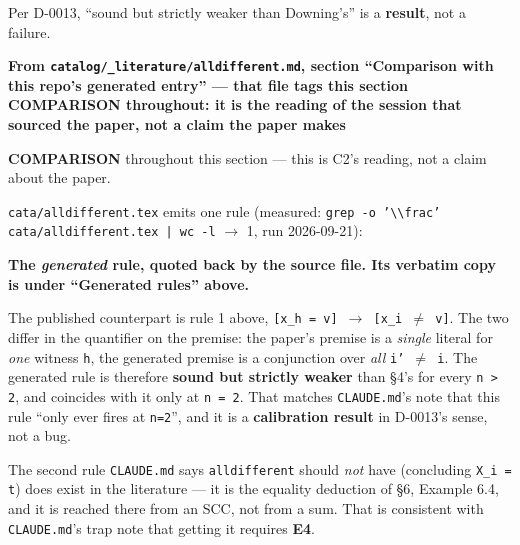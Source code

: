 \documentclass[10pt,a4paper]{article}
\newcommand{\provtag}[2]{{\small\sffamily\bfseries\textcolor{#1}{#2}}}
\newenvironment{calblock}{%
  \par\smallskip
  \def\FrameCommand{\textcolor{calbar}{\vrule width 1pt}\hspace{9pt}}%
  \MakeFramed{\advance\hsize-\width\FrameRestore}}%
  {\endMakeFramed\par\smallskip}
\newcommand{\litsubsub}[1]{\par{\sffamily\bfseries\small #1\par}}
\newcommand{\genrulehead}[1]{\par{\small\textbf{#1}\par}}
\newcommand{\litline}[1]{\noindent
  \resizebox{\ifdim\width>\linewidth\linewidth\else\width\fi}{!}{#1}\par}
\begin{document}
\begin{calblock}
Per D-0013, ``sound but strictly weaker than Downing's'' is a \textbf{result}, not a failure.

\litsubsub{From \texttt{catalog/\_\allowbreak{}literature/alldifferent.md}, section ``Comparison with this repo's generated entry'' --- that file tags this section \provtag{tagcomparison}{COMPARISON} throughout: it is the reading of the session that sourced the paper, not a claim the paper makes}
\provtag{tagcomparison}{COMPARISON} throughout this section --- this is C2's reading, not a claim about the paper.

\texttt{cata/alldifferent.tex} emits one rule (measured: \texttt{grep -\allowbreak{}o '\textbackslash{}\textbackslash{}frac' cata/\allowbreak{}alldifferent.\allowbreak{}tex | wc -\allowbreak{}l} $\rightarrow$ 1, run 2026-09-21):

\genrulehead{The \emph{generated} rule, quoted back by the source file. Its verbatim copy is under ``Generated rules'' above.}
{\raggedright
\litline{\ttfamily\small X\_\{i'\} = t,~~$\forall$i',~~i' $\neq$ i,~~i' $\in$ $\llbracket$1,n$\rrbracket$,~~i $\in$ $\llbracket$1,n$\rrbracket$}
\litline{\ttfamily\small ------------------------------- $\vdash$}
\litline{\ttfamily\small X\_i $\neq$ t}
\par}
The published counterpart is rule 1 above, \texttt{[x\_h = v] $\rightarrow$ [x\_i $\neq$ v]}. The two differ in the quantifier on the premise: the paper's premise is a \emph{single} literal for \emph{one} witness \texttt{h}, the generated premise is a conjunction over \emph{all} \texttt{i' $\neq$ i}. The generated rule is therefore \textbf{sound but strictly weaker} than \S{}4's for every \texttt{n > 2}, and coincides with it only at \texttt{n = 2}. That matches \texttt{CLAUDE.md}'s note that this rule ``only ever fires at \texttt{n=2}'', and it is a \textbf{calibration result} in D-0013's sense, not a bug.

The second rule \texttt{CLAUDE.md} says \texttt{alldifferent} should \emph{not} have (concluding \texttt{X\_i = t}) does exist in the literature --- it is the equality deduction of \S{}6, Example 6.4, and it is reached there from an SCC, not from a sum. That is consistent with \texttt{CLAUDE.md}'s trap note that getting it requires \textbf{E4}.

\par\smallskip
\end{calblock}
\end{document}
